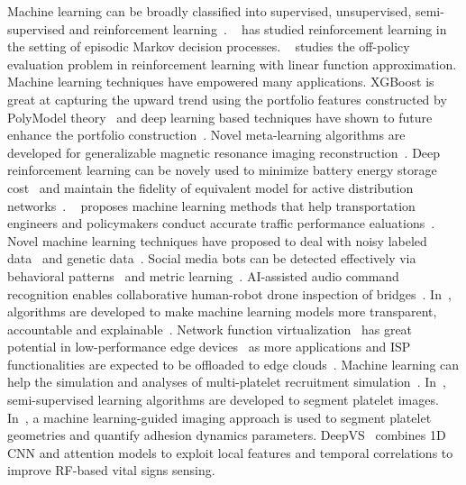 Machine learning can be broadly classified into supervised, unsupervised, semi-supervised and reinforcement learning~\cite{yifei2022,yifei2022path}.
~\cite{yifei2023} has studied reinforcement learning in the setting of episodic Markov decision processes.
~\cite{yifei2021} studies the off-policy evaluation problem in reinforcement learning with linear function approximation.
Machine learning techniques have empowered many applications.
XGBoost is great at capturing the upward trend using the portfolio features constructed by PolyModel theory~\cite{siqiao2023} 
and deep learning based techniques have shown to future enhance the portfolio construction~\cite{siqiao2024}.
Novel meta-learning algorithms are developed for generalizable magnetic resonance imaging reconstruction~\cite{wanyu_thesis}.
Deep reinforcement learning can be novely used to minimize battery energy storage cost~\cite{binhuang2023grid} 
and maintain the fidelity of equivalent model for active distribution networks~\cite{binhuang2023renew}.
~\cite{xiaobo_thesis} proposes machine learning methods that help transportation engineers and policymakers conduct accurate traffic performance ealuations~\cite{xiaobo2020,xiaobo2021,xiaobo2023}.
Novel machine learning techniques have proposed to deal with noisy labeled data~\cite{jinjin2023} and genetic data~\cite{jinjin_thesis}.
Social media bots can be detected effectively via behavioral patterns~\cite{wu2023botshape} and metric learning~\cite{wu2023bottrinet}.
AI-assisted audio command recognition enables collaborative human-robot drone inspection of bridges~\cite{yuli_thesis}.
In~\cite{ziheng_thesis,ziheng2022}, algorithms are developed to make machine learning models more transparent, accountable and explainable~\cite{ziheng_relax,ziheng2023dark}.
Network function virtualization~\cite{wang2023thesis,wang2022quadrant,wang2020slos} has great potential in low-performance edge devices~\cite{wang2023scheduling}
as more applications and ISP functionalities are expected to be offloaded to edge clouds~\cite{wang2021galleon,wang2023pinolo}.
Machine learning can help the simulation and analyses of multi-platelet recruitment simulation~\cite{yicong_thesis}.
In~\cite{peineng2021,peineng2021semi}, semi-supervised learning algorithms are developed to segment platelet images.
In~\cite{peineng2023}, a machine learning-guided imaging approach is used to segment platelet geometries and quantify adhesion dynamics parameters.
DeepVS~\cite{zongxing2022dl} combines 1D CNN and attention models to exploit local features and temporal correlations to improve RF-based vital signs sensing.

